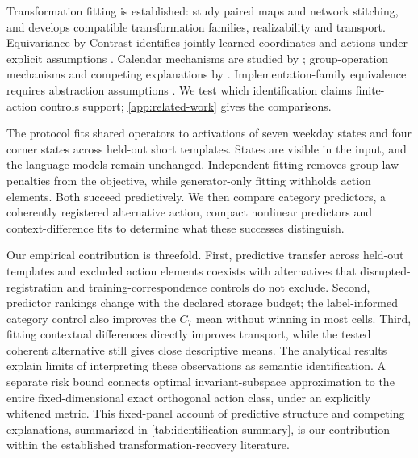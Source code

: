 \documentclass{article}
\begin{document}
Transformation fitting is established: \citet{lenc2015understanding} study paired maps and network stitching, and \citet{sun2026transformationlaws} develops compatible transformation families, realizability and transport. Equivariance by Contrast identifies jointly learned coordinates and actions under explicit assumptions \citep{schmidt2025equivariance}. Calendar mechanisms are studied by \citet{engels2025notall}; group-operation mechanisms and competing explanations by \citet{nanda2023progress,chughtai2023toy,wu2025unified}. Implementation-family equivalence requires abstraction assumptions \citep{sun2026tracking}. We test which identification claims finite-action controls support; \cref{app:related-work} gives the comparisons.

The protocol fits shared operators to activations of seven weekday states and four corner states across held-out short templates. States are visible in the input, and the language models remain unchanged. Independent fitting removes group-law penalties from the objective, while generator-only fitting withholds action elements. Both succeed predictively. We then compare category predictors, a coherently registered alternative action, compact nonlinear predictors and context-difference fits to determine what these successes distinguish.



Our empirical contribution is threefold. First, predictive transfer across held-out templates and excluded action elements coexists with alternatives that disrupted-registration and training-correspondence controls do not exclude. Second, predictor rankings change with the declared storage budget; the label-informed category control also improves the $C_7$ mean without winning in most cells. Third, fitting contextual differences directly improves transport, while the tested coherent alternative still gives close descriptive means. The analytical results explain limits of interpreting these observations as semantic identification. A separate risk bound connects optimal invariant-subspace approximation to the entire fixed-dimensional exact orthogonal action class, under an explicitly whitened metric. This fixed-panel account of predictive structure and competing explanations, summarized in \cref{tab:identification-summary}, is our contribution within the established transformation-recovery literature.
\end{document}
